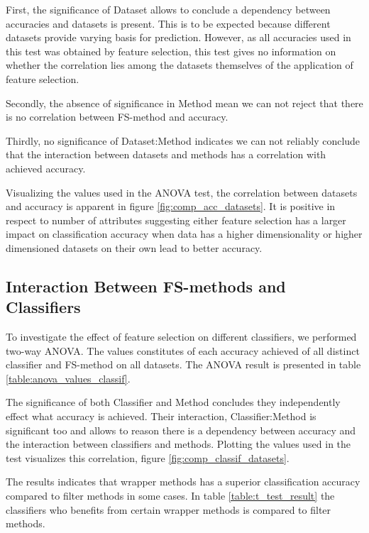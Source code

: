 

First, the significance of Dataset allows to conclude a dependency between accuracies and datasets is present. This is to be expected because different datasets provide varying basis for prediction. However, as all accuracies used in this test was obtained by feature selection, this test gives no information on whether the correlation lies among the datasets themselves of the application of feature selection.

Secondly, the absence of significance in Method mean we can not reject that there is no correlation between FS-method and accuracy.

Thirdly, no significance of Dataset:Method indicates we can not reliably conclude that the interaction between datasets and methods has a correlation with achieved accuracy.

Visualizing the values used in the ANOVA test, the correlation between datasets and accuracy is apparent in figure \ref{fig:comp_acc_datasets}. It is positive in respect to number of attributes suggesting either feature selection has a larger impact on classification accuracy when data has a higher dimensionality or higher dimensioned datasets on their own lead to better accuracy.



\subsection{Interaction Between FS-methods and Classifiers}
\label{sec:fs_methods_classifiers}

To investigate the effect of feature selection on different classifiers, we performed two-way ANOVA. The values constitutes of each accuracy achieved of all distinct classifier and FS-method on all datasets. The ANOVA result is presented in table \ref{table:anova_values_classif}.



The significance of both Classifier and Method concludes they independently effect what accuracy is achieved. Their interaction, Classifier:Method is significant too and allows to reason there is a dependency between accuracy and the interaction between classifiers and methods. Plotting the values used in the test visualizes this correlation, figure \ref{fig:comp_classif_datasets}.

The results indicates that wrapper methods has a superior classification accuracy compared to filter methods in some cases. In table \ref{table:t_test_result} the classifiers who benefits from certain wrapper methods is compared to filter methods.

